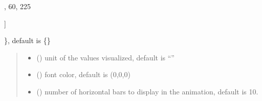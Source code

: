 \documentclass[letterpaper,10pt,english]{sphinxmanual}
\begin{document}
\begin{fulllineitems}
\begin{quote}
\begin{description}
\begin{itemize}
\end{itemize}

\end{description}\end{quote}
\begin{description}
\begin{description}
\sphinxlineitem{\{}\begin{description}
\sphinxlineitem{“United States”: {[}}
,
60,
225

\end{description}

\sphinxAtStartPar
{]}

\end{description}

\sphinxAtStartPar
\}, default is \{\}

\end{description}
\begin{quote}\begin{description}
\begin{itemize}
\item {} 
\sphinxAtStartPar
{} () \textendash{} unit of the values visualized, default is “”

\item {} 
\sphinxAtStartPar
{} () \textendash{} font color, default is (0,0,0)

\item {} 
\sphinxAtStartPar
{} () \textendash{} number of horizontal bars to display in the animation, default is 10.

\end{itemize}

\end{description}\end{quote}

\begin{fulllineitems}
\label{\detokenize{index:sjvisualizer.StackedBarChart.stacked_bar_chart.draw}}
\pysigstartsignatures
{}
\pysigstopsignatures
\end{fulllineitems}


\end{fulllineitems}
\end{document}
